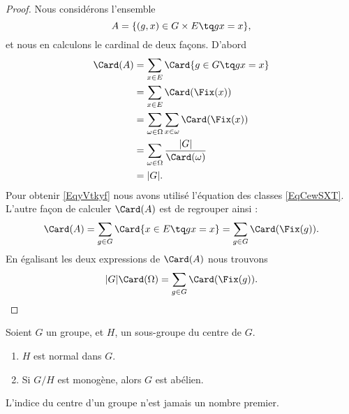 \begin{proof}
	Nous considérons l'ensemble
	\begin{equation}
		A=\{ (g,x)\in G\times E\tq gx=x \},
	\end{equation}
	et nous en calculons le cardinal de deux façons. D'abord
	\begin{subequations}
		\begin{align}
			\Card(A) & =\sum_{x\in E}\Card\{ g\in G\tq gx=x \}                                      \\
			         & =\sum_{x\in E}\Card(\Fix(x))                                                 \\
			         & =\sum_{\omega\in \Omega}\sum_{x\in \omega}\Card(\Fix(x))                     \\
			         & =\sum_{\omega\in \Omega}\frac{ | G | }{ \Card(\omega) }     \label{EqyVtkyf} \\
			         & =| G |.
		\end{align}
	\end{subequations}
	Pour obtenir \eqref{EqyVtkyf} nous avons utilisé l'équation des classes \eqref{EqCewSXT}. L'autre façon de calculer \( \Card(A)\) est de regrouper ainsi :
	\begin{equation}
		\Card(A)=\sum_{g\in G}\Card\{ x\in E\tq gx=x \}=\sum_{g\in G}\Card(\Fix(g)).
	\end{equation}
	En égalisant les deux expressions de \( \Card(A)\) nous trouvons
\begin{equation}
		| G |\Card(\Omega)=\sum_{g\in G}\Card(\Fix(g)).
	\end{equation}
\end{proof}

\begin{proposition}     \label{PROPooMYKKooLetZWi}
	Soient \( G\) un groupe, et \( H\), un sous-groupe du centre de \( G\).
	\begin{enumerate}
		\item
		      \( H\) est normal dans \( G\).
		\item
		      Si \( G/H\) est monogène, alors \( G\) est abélien.
	\end{enumerate}
\end{proposition}

\begin{proposition}
    L'indice du centre d'un groupe n'est jamais un nombre premier.
\end{proposition}

